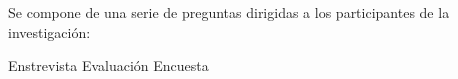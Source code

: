 
\question Se compone de una serie de preguntas dirigidas a los participantes
          de la investigación:

  \begin{oneparchoices}
    \choice Enstrevista
    \choice Evaluación
    \CorrectChoice Encuesta
  \end{oneparchoices}
